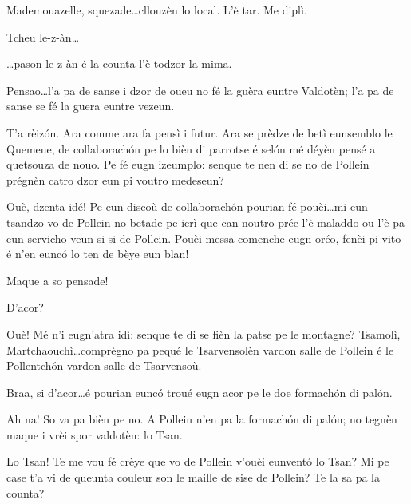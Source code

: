 \begin{drama}

\Dorinaspeaks{} Mademouazelle, squezade\ldots cllouzèn lo local. L'è tar. Me diplì.


\Genespeaks Tcheu le-z-àn\ldots

\Dorinaspeaks \ldots pason le-z-àn é la counta l'è todzor la mima.

\ridocliou




\Laurentspeaks{} Pensao\ldots l'a pa de sanse i dzor de oueu no fé la guèra euntre Valdotèn; l'a pa de sanse se fé la guera euntre vezeun.

\Taniaspeaks T'a rèiz\'on. Ara comme ara fa pensì i futur. Ara se prèdze de betì eunsemblo le Quemeue, de collaborach\'on pe lo bièn di parrotse é sel\'on mé déyèn pensé a quetsouza de nouo. Pe fé eugn izeumplo: senque te nen di se no de Pollein prégnèn catro dzor eun pi voutro medeseun?

\Laurentspeaks Ouè, dzenta idé! Pe eun discoù de collaborach\'on pourian fé pouèi\ldots mi eun tsandzo vo de Pollein no betade pe icrì que can noutro prée l'è maladdo ou l'è pa eun servicho veun si si de Pollein. Pouèi messa comenche eugn oréo, fenèi pi vito é n'en eunc\'o lo ten de bèye eun blan!

\Taniaspeaks Maque a so pensade!

\Laurentspeaks D'acor?

\Taniaspeaks Ouè! Mé n'i eugn'atra idì: senque te di se fièn la patse pe le montagne? Tsamolì, Martchaouchì\ldots comprègno pa pequé le Tsarvensolèn vardon salle de Pollein é le Pollentch\'on vardon salle de Tsarvensoù.

\Laurentspeaks Braa, si d'acor\ldots é pourian eunc\'o troué eugn acor pe le doe formach\'on di pal\'on.

\Taniaspeaks Ah na! So va pa bièn pe no. A Pollein n'en pa la formach\'on di pal\'on; no tegnèn maque i vrèi spor valdotèn: lo Tsan.

\Laurentspeaks Lo Tsan! Te me vou fé crèye que vo de Pollein v'ouèi eunvent\'o lo Tsan? Mi pe case t'a vi de queunta couleur son le maille de sise de Pollein? Te la sa pa la counta?


\end{drama}
